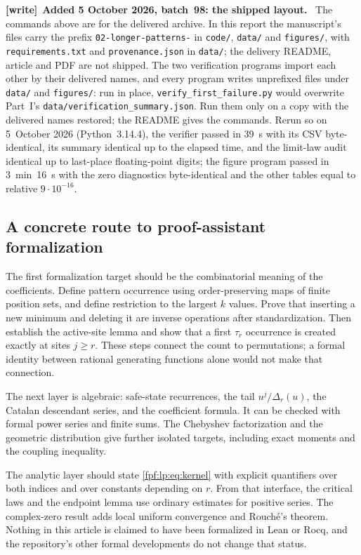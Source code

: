\documentclass[11pt]{article}
\numberwithin{equation}{section}
\theoremstyle{definition}
\newenvironment{writenote}[1][]{\par\smallskip\begingroup\small
 \noindent\textbf{[write]}\if\relax\detokenize{#1}\relax\else~\textbf{#1.}\fi\ }%
 {\par\endgroup\smallskip}
\begin{document}
\begin{writenote}[Added 5 October 2026, batch~98: the shipped layout]
The commands above are for the delivered archive. In this report the
manuscript's files carry the prefix \texttt{02-longer-patterns-} in
\texttt{code/}, \texttt{data/} and \texttt{figures/}, with
\texttt{requirements.txt} and \texttt{provenance.json} in \texttt{data/};
the delivery README, article and PDF are not shipped. The two verification
programs import each other by their delivered names, and every program
writes unprefixed files under \texttt{data/} and \texttt{figures/}: run in
place, \texttt{verify\_first\_failure.py} would overwrite Part~I's
\texttt{data/verification\_summary.json}. Run them only on a copy with the
delivered names restored; the README gives the commands. Rerun so on
5~October 2026 (Python~3.14.4), the verifier passed in 39~s with its CSV
byte-identical, its summary identical up to the elapsed time, and the
limit-law audit identical up to last-place floating-point digits; the
figure program passed in 3~min~16~s with the zero diagnostics
byte-identical and the other tables equal to relative \(9\cdot10^{-16}\).
\end{writenote}

\subsection{A concrete route to proof-assistant formalization}

The first formalization target should be the combinatorial meaning of
the coefficients. Define pattern occurrence using order-preserving
maps of finite position sets, and define restriction to the largest
\(k\) values. Prove that inserting a new minimum and deleting it are
inverse operations after standardization. Then establish the active-site
lemma and show that a first \(\tau_r\) occurrence is created exactly
at sites \(j\ge r\). These steps connect the count to permutations;
a formal identity between rational generating functions alone would
not make that connection.

The next layer is algebraic: safe-state recurrences, the tail
\(u^j/\Delta_r(u)\), the Catalan descendant series, and the coefficient
formula. It can be checked with formal power series and finite sums.
The Chebyshev factorization and the geometric distribution give further
isolated targets, including exact moments and the coupling inequality.

The analytic layer should state \eqref{fpf:lp:eq:kernel} with explicit
quantifiers over both indices and over constants depending on \(r\).
From that interface, the critical laws and the endpoint lemma use
ordinary estimates for positive series. The complex-zero result adds
local uniform convergence and Rouch\'e's theorem. Nothing in this
article is claimed to have been formalized in Lean or Rocq, and the
repository's other formal developments do not change that status.
\end{document}
